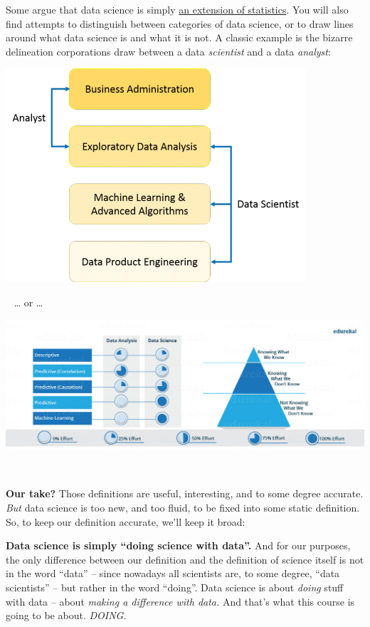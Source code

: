 \documentclass[
]{book}
\begin{document}
Some argue that data science is simply \href{https://www.statisticsviews.com/article/nate-silver-what-i-need-from-statisticians/}{an extension of statistics}. You will also find attempts to distinguish between categories of data science, or to draw lines around what data science is and what it is not. A classic example is the bizarre delineation corporations draw between a data \emph{scientist} and a data \emph{analyst}:

\includegraphics{img/venn2.png}

~
\ldots{} or \ldots{}
~

\includegraphics{img/venn3.jpg}

~

\textbf{Our take?} Those definitions are useful, interesting, and to some degree accurate. \emph{But} data science is too new, and too fluid, to be fixed into some static definition. So, to keep our definition accurate, we'll keep it broad:

\textbf{Data science is simply ``doing science with data''.} And for our purposes, the only difference between our definition and the definition of science itself is not in the word ``data'' -- since nowadays all scientists are, to some degree, ``data scientists'' -- but rather in the word ``doing''. Data science is about \emph{doing} stuff with data -- about \emph{making a difference with data.} And that's what this course is going to be about. \emph{DOING}.
\end{document}
